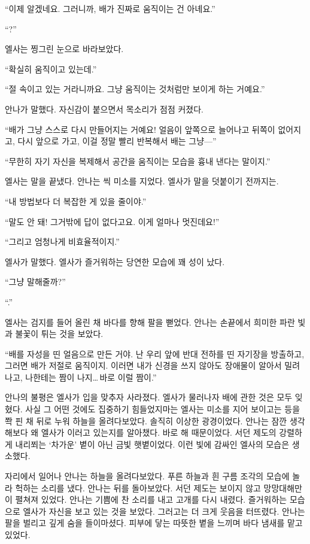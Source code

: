 ``이제 알겠네요. 그러니까, 배가 진짜로 움직이는 건 아녜요.''

``?''

엘사는 찡그린 눈으로 바라보았다.

``확실히 움직이고 있는데.''

``절 속이고 있는 거라니까요. 그냥 움직이는 것처럼만 보이게 하는 거예요.''

안나가 말했다. 자신감이 붙으면서 목소리가 점점 커졌다.

``배가 그냥 스스로 다시 만들어지는 거예요! 얼음이 앞쪽으로 늘어나고 뒤쪽이 없어지고, 다시 앞으로 가고, 이걸 정말 빨리 반복해서 배는 그냥—''

``무한히 자기 자신을 복제해서 공간을 움직이는 모습을 흉내 낸다는 말이지.''

엘사는 말을 끝냈다. 안나는 씩 미소를 지었다. 엘사가 말을 덧붙이기 전까지는.

``내 방법보다 더 복잡한 게 있을 줄이야.''

``말도 안 돼! 그거밖에 답이 없다고요. 이게 얼마나 멋진데요!''

``그리고 엄청나게 비효율적이지.''

엘사가 말했다. 엘사가 즐거워하는 당연한 모습에 꽤 성이 났다.

``그냥 말해줄까?''

``.''

엘사는 검지를 들어 올린 채 바다를 향해 팔을 뻗었다. 안나는 손끝에서 희미한 파란 빛과 불꽃이 튀는 것을 보았다.

``배를 자성을 띤 얼음으로 만든 거야. 난 우리 앞에 반대 전하를 띤 자기장을 방출하고, 그러면 배가 저절로 움직이지. 이러면 내가 신경을 쓰지 않아도 장애물이 알아서 밀려나고, 나한테는 짬이 나지\ldots\,바로 이럴 짬이.''

안나의 불평은 엘사가 입을 맞추자 사라졌다. 엘사가 물러나자 배에 관한 것은 모두 잊혔다. 사실 그 어떤 것에도 집중하기 힘들었지마는 엘사는 미소를 지어 보이고는 등을 쫙 핀 채 뒤로 누워 하늘을 올려다보았다. 솔직히 이상한 광경이었다. 안나는 잠깐 생각해보다 왜 엘사가 이러고 있는지를 알아챘다. 바로 해 때문이었다. 서던 제도의 강렬하게 내리쬐는 `차가운' 볕이 아닌 금빛 햇볕이었다. 이런 빛에 감싸인 엘사의 모습은 생소했다.

자리에서 일어나 안나는 하늘을 올려다보았다. 푸른 하늘과 흰 구름 조각의 모습에 놀라 헉하는 소리를 냈다. 안나는 뒤를 돌아보았다. 서던 제도는 보이지 않고 망망대해만이 펼쳐져 있었다. 안나는 기쁨에 찬 소리를 내고 고개를 다시 내렸다. 즐거워하는 모습으로 엘사가 자신을 보고 있는 것을 보았다. 그러고는 더 크게 웃음을 터뜨렸다. 안나는 팔을 벌리고 깊게 숨을 들이마셨다. 피부에 닿는 따뜻한 볕을 느끼며 바다 냄새를 맡고 있었다.

